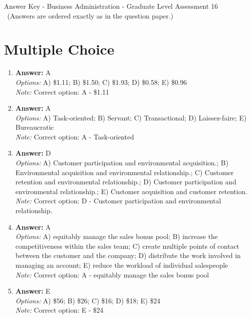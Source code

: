 \documentclass[12pt]{article}
\begin{document}
\begin{center}
Answer Key - Business Administration - Graduate Level Assessment 16 \
\small (Answers are ordered exactly as in the question paper.)
\end{center}

\section*{Multiple Choice}
\begin{enumerate}[label=\arabic*.]
\item \textbf{Answer:} A
\\ \textit{Options:} A) \$1.11; B) \$1.50; C) \$1.93; D) \$0.58; E) \$0.96
\\ \textit{Note:} Correct option: A - \$1.11
\item \textbf{Answer:} A
\\ \textit{Options:} A) Task-oriented; B) Servant; C) Transactional; D) Laissez-faire; E) Bureaucratic
\\ \textit{Note:} Correct option: A - Task-oriented
\item \textbf{Answer:} D
\\ \textit{Options:} A) Customer participation and environmental acquisition.; B) Environmental acquisition and environmental relationship.; C) Customer retention and environmental relationship.; D) Customer participation and environmental relationship.; E) Customer acquisition and customer retention.
\\ \textit{Note:} Correct option: D - Customer participation and environmental relationship.
\item \textbf{Answer:} A
\\ \textit{Options:} A) equitably manage the sales bonus pool; B) increase the competitiveness within the sales team; C) create multiple points of contact between the customer and the company; D) distribute the work involved in managing an account; E) reduce the workload of individual salespeople
\\ \textit{Note:} Correct option: A - equitably manage the sales bonus pool
\item \textbf{Answer:} E
\\ \textit{Options:} A) \$56; B) \$26; C) \$16; D) \$18; E) \$24
\\ \textit{Note:} Correct option: E - \$24
\end{enumerate}
\end{document}
